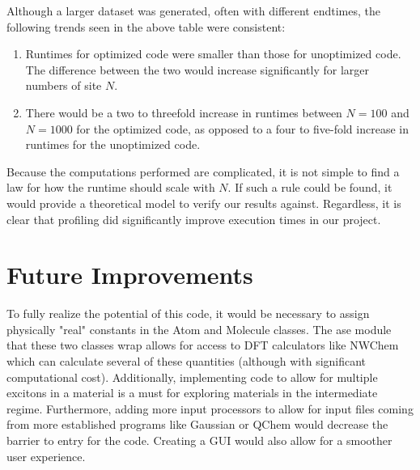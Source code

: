 \documentclass{article}
\begin{document}
Although a larger dataset was generated, often with different endtimes, the following trends seen in the above table were consistent: 
\begin{enumerate}
    \item Runtimes for optimized code were smaller than those for unoptimized code. The difference between the two would increase significantly for larger numbers of site $N$.
    \item There would be a two to threefold increase in runtimes between $N = 100$ and $N = 1000$ for the optimized code, as opposed to a four to five-fold increase in runtimes for the unoptimized code.
\end{enumerate}

Because the computations performed are complicated, it is not simple to find a law for how the runtime should scale with $N$. If such a rule could be found, it would provide a theoretical model to verify our results against. Regardless, it is clear that profiling did significantly improve execution times in our project.


\section{Future Improvements}

To fully realize the potential of this code, it would be necessary to assign physically "real" constants in the Atom and Molecule classes. The ase module that these two classes wrap allows for access to DFT calculators like NWChem which can calculate several of these quantities (although with significant computational cost). Additionally, implementing code to allow for multiple excitons in a material is a must for exploring materials in the intermediate regime. Furthermore, adding more input processors to allow for input files coming from more established programs like Gaussian or QChem would decrease the barrier to entry for the code. Creating a GUI would also allow for a smoother user experience.





\printbibliography
\end{document}
